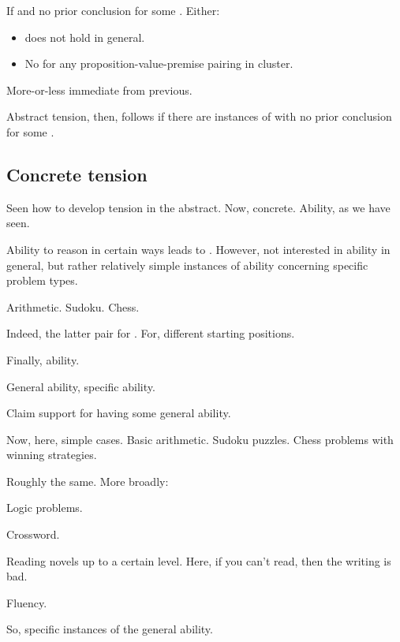 \begin{note}
  \begin{proposition}
    If \ragCluster{} and no prior conclusion for some \jag{}.
    Either:
    \begin{itemize}
    \item
      \ESU{} does not hold in general.
    \item
      No \csVImp{} for any proposition-value-premise pairing in cluster.
    \end{itemize}
      \begin{argument}
    More-or-less immediate from previous.
  \end{argument}
  \end{proposition}
\end{note}

\begin{note}
  Abstract tension, then, follows if there are instances of  with no prior conclusion for some \jag{}.
\end{note}

\subsection{Concrete tension}
\label{sec:concrete-tension}

\begin{note}
  Seen how to develop tension in the abstract.
  Now, concrete.
  Ability, as we have seen.
\end{note}

\begin{note}[Ability]
  Ability to reason in certain ways leads to .
  However, not interested in ability in general, but rather relatively simple instances of ability concerning specific problem types.

  Arithmetic.
  Sudoku.
  Chess.

  Indeed, the latter pair for .
  For, different starting positions.
\end{note}

\begin{note}
  Finally, ability.

  General ability, specific ability.

  Claim support for having some general ability.

  Now, here, simple cases.
  Basic arithmetic.
  Sudoku puzzles.
  Chess problems with winning strategies.

  Roughly the same.
  More broadly:

  Logic problems.

  Crossword.

  Reading novels up to a certain level.
  Here, if you can't read, then the writing is bad.

  Fluency.

  So, specific instances of the general ability.
\end{note}


